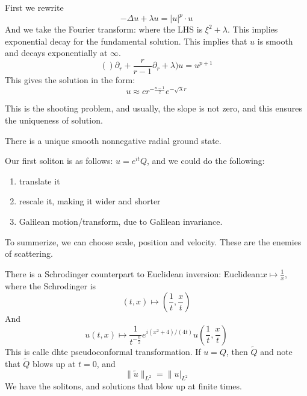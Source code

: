 First we rewrite
\begin{equation*}
    -\Delta u+\lambda u=|u|^p\cdot u
\end{equation*}
And we take the Fourier transform: where the LHS is $\xi^2+\lambda$. This implies exponential decay for the fundamental solution. This implies that $u$ is smooth and decays exponentially at $\infty$.
\begin{equation*}
    ()\partial_r+\frac{r}{r-1}\partial_r+\lambda)u=u^{p+1}
\end{equation*}
This gives the solution in the form:
\begin{equation*}
    u\approx cr^{-\frac{n-1}{2}}e^{-\sqrt{\lambda}r}
\end{equation*}
\begin{note}
    This is the shooting problem, and usually, the slope is not zero, and this ensures the uniqueness of solution.
\end{note}

\begin{theorem}
    There is a unique smooth nonnegative radial ground state.
\end{theorem}

Our first soliton is as follows: $u=e^{it}Q$, and we could do the following:
\begin{enumerate}
    \item translate it
    \item rescale it, making it wider and shorter
    \item Galilean motion/transform, due to Galilean invariance. 
\end{enumerate}
To summerize, we can choose scale, position and velocity.  These are the enemies of scattering.

There is a Schrodinger counterpart to Euclidean inversion:
Euclidean:$ x\mapsto\frac{1}{x}$, where the Schrodinger is
\begin{equation*}
    (t,x)\mapsto \left(\frac{1}{t}, \frac{x}{t}\right)
\end{equation*}
And 
\begin{equation*}
    u(t,x)\mapsto \frac{1}{t^{-\frac{n}{2}}}e^{i(x^2+4)/(4t)}u(\frac{1}{t}, \frac{x}{t})
\end{equation*}
This is calle dhte pseudoconformal transformation. If $u=Q$, then $\tilde{Q}$ and note that $\tilde{Q}$ blows up at $t=0$, and 
\begin{equation*}
    \|\tilde{u}\|_{L^2}=\|u|_{L^2}
\end{equation*}
We have the solitons, and solutions that blow up at finite times. 

